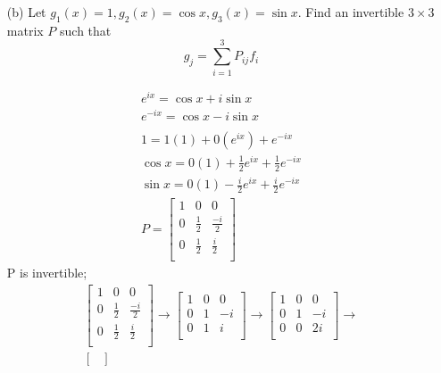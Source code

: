 \documentclass{article}
\begin{document}
\begin{enumerate}[listparindent=\parindent]
\begin{enumerate}[listparindent=\parindent]
        \item[(b)] Let \(g_1(x) = 1, g_2(x) = \cos x, g_3(x) = \sin x\). Find an invertible \(3 \times 3\) matrix \(P\) such that
            \[g_j = \sum_{i = 1}^3 P_{ij}f_i\]

        \begin{gather*}
            e^{ix} = \cos x + i\sin x \\
            e^{-ix} = \cos x - i\sin x \\
            \\
            1 = 1(1) + 0(e^{ix}) + e^{-ix} \\
            \cos x = 0(1) + \frac{1}{2}e^{ix} + \frac{1}{2}e^{-ix} \\
            \sin x = 0(1) - \frac{i}{2}e^{ix} + \frac{i}{2}e^{-ix} \\
            P = \begin{bmatrix}
                1 & 0 & 0 \\
                0 & \frac{1}{2} & \frac{-i}{2} \\
                0 & \frac{1}{2} & \frac{i}{2} \\
            \end{bmatrix}
        \end{gather*}
        P is invertible;
        \begin{gather*}
            \begin{bmatrix}
                1 & 0 & 0 \\
                0 & \frac{1}{2} & \frac{-i}{2} \\
                0 & \frac{1}{2} & \frac{i}{2} \\
            \end{bmatrix}
            \rightarrow
            \begin{bmatrix}
                1 & 0 & 0 \\
                0 & 1 & -i \\
                0 & 1 & i \\
            \end{bmatrix}
            \rightarrow
            \begin{bmatrix}
                1 & 0 & 0 \\
                0 & 1 & -i \\
                0 & 0 & 2i \\
            \end{bmatrix}
            \rightarrow \\
            \begin{bmatrix}

\end{bmatrix}
\end{gather*}
\end{enumerate}
\end{enumerate}
\end{document}
